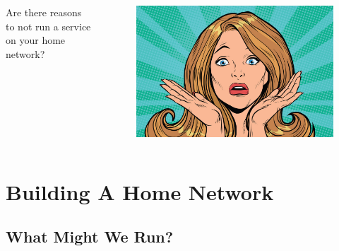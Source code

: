 \documentclass{beamer}
\begin{document}
\begin{frame}
    \begin{columns}
        \begin{column}{0.5\textwidth}
            Are there reasons to not run a service on your home network?
        \end{column}
        \begin{column}{0.5\textwidth}
            \begin{figure}
                \centering
                \includegraphics[width=1\textwidth,keepaspectratio]{../resources/confusion.jpg}
            \end{figure}
        \end{column}
    \end{columns}
\end{frame}

\section{Building A Home Network}
\subsection{What Might We Run?}
\end{document}
